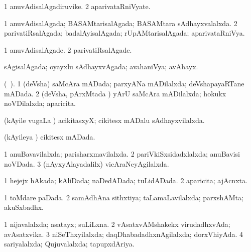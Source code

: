 \bentry
{} 
\gl{\nA}
\expl{}
\bmng
\bnum
\num{1} anuvAdisalAgadiruvike. 
\num{2} aparivataRniVyate. 
\enum
\emng
\eentry

\bentry
{} 
\gl{\gu}
\expl{}
\bmng
\bnum
\num{1} anuvAdisalAgada; BASAMtarisalAgada; BASAMtara sAdhayxvalalxda. 
\num{2} parivatiRsalAgada; badalAyisalAgada; rUpAMtarisalAgada; aparivataRniVya. 
\enum
\emng
\eentry

\bentry
{} 
\gl{\kirxvi}
\expl{}
\bmng
\bnum
\num{1} anuvAdisalAgade. 
\num{2} parivatiRsalAgade. 
\enum
\emng
\eentry

\bentry
{} 
\gl{\gu}
\expl{}
\bmng
sAgisalAgada; oyayxlu sAdhayxvAgada; avahaniVya; avAhayx. 
\emng
\eentry

\bentry
{} 
\gl{\gu}
\expl{}
\bmng
(\ame\ ). 
\bnum
\num{1} (deVsha) saMcAra mADada; parxyANa mADilalxda; deVshapayaRTane mADada. 
\num{2} (deVsha, pArxMtada \vi) yArU saMcAra mADilalxda; hokukx noVDilalxda; aparicita. 
\enum
\emng
\eentry

\bentry
{} 
\gl{\gu}
\expl{}
\bmng
 (kAyile \mo vugaLa \vi) acikitasxyX; cikitesx mADalu sAdhayxvilalxda. 
\emng
\eentry

\bentry
{} 
\gl{\gu}
\expl{}
\bmng
(kAyileya \vi) cikitesx mADada. 
\emng
\eentry

\bentry
{} 
\gl{\gu}
\expl{}
\bmng
\bnum
\num{1} anuBavavilalxda; parisharxmavilalxda. 
\num{2} pariVkiSxsidadxlalxda; anuBavisi noVDada. 
\num{3} (nAyxyAlayadalilx) vicAraNeyAgilalxda. 
\enum
\emng
\eentry

\bentry
{} 
\gl{\gu}
\expl{}
\bmng
\bnum
\num{1} hejejx hAkada; kAliDada; naDedADada; tuLidADada. 
\num{2} aparicita; ajAcnxta. 
\enum
\emng
\eentry

\bentry
{} 
\gl{\gu}
\expl{}
\bmng
\bnum
\num{1} toMdare paDada. 
\num{2} samAdhAna sithxtiya; taLamaLavilalxda; parxshAMta; akuSxbadhx. 
\enum
\emng
\eentry

\bentry
{} 
\gl{\gu}
\expl{}
\bmng
\bnum
\num{1} nijavalalxda; asatayx; suLiLxna. 
\num{2} vAsatxvAMshakekx virudadhxvAda; avAsatxvika. 
\num{3} niSeThxyilalxda; daqDhabadadhxnAgilalxda; dorxVhiyAda. 
\num{4} sariyalalxda; Qujuvalalxda; tapupxdAriya. 
\enum
\emng
\eentry

